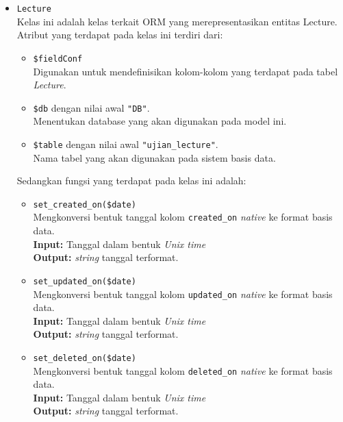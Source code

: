 \begin{itemize}
        \item \texttt{Lecture} \\
            Kelas ini adalah kelas terkait ORM yang merepresentasikan entitas Lecture. Atribut yang 
            terdapat pada kelas ini terdiri dari:
            \begin{itemize}
                \item \texttt{\$fieldConf} \\
                    Digunakan untuk mendefinisikan kolom-kolom yang terdapat pada tabel \textit{Lecture}.
                \item \texttt{\$db} dengan nilai awal \texttt{"DB"}. \\
                    Menentukan database yang akan digunakan pada model ini.
                \item \texttt{\$table} dengan nilai awal \texttt{"ujian\_lecture"}. \\
                    Nama tabel yang akan digunakan pada sistem basis data. 
            \end{itemize}
            Sedangkan fungsi yang terdapat pada kelas ini adalah:
            \begin{itemize}
                \item \texttt{set\_created\_on(\$date)} \\
                    Mengkonversi bentuk tanggal kolom \texttt{created\_on} \textit{native} ke 
                    format basis data. \\
                    \textbf{Input:} Tanggal dalam bentuk \textit{Unix time}\\
                    \textbf{Output:} \textit{string} tanggal terformat.
                
                \item \texttt{set\_updated\_on(\$date)} \\
                    Mengkonversi bentuk tanggal kolom \texttt{updated\_on} \textit{native} ke 
                    format basis data. \\
                    \textbf{Input:} Tanggal dalam bentuk \textit{Unix time}\\
                    \textbf{Output:} \textit{string} tanggal terformat.
                    
                \item \texttt{set\_deleted\_on(\$date)} \\
                    Mengkonversi bentuk tanggal kolom \texttt{deleted\_on} \textit{native} ke 
                    format basis data. \\
                    \textbf{Input:} Tanggal dalam bentuk \textit{Unix time}\\
                    \textbf{Output:} \textit{string} tanggal terformat.
                    

\end{itemize}
\end{itemize}
